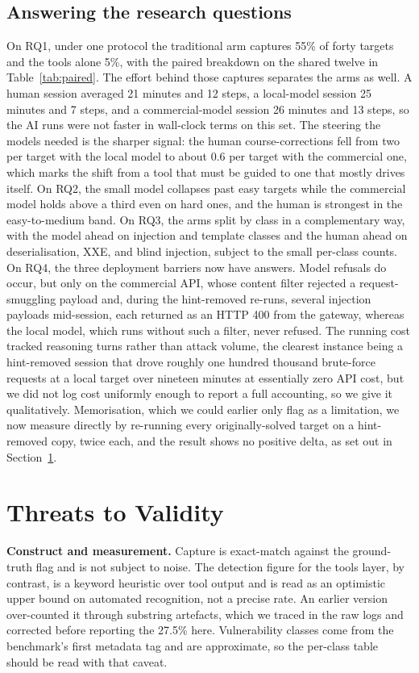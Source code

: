 \documentclass[conference]{IEEEtran}
\begin{document}
\subsection{Answering the research questions}
On RQ1, under one protocol the traditional arm captures 55\% of forty targets and the tools alone 5\%, with the paired breakdown on the shared twelve in Table~\ref{tab:paired}. The effort behind those captures separates the arms as well. A human session averaged 21 minutes and 12 steps, a local-model session 25 minutes and 7 steps, and a commercial-model session 26 minutes and 13 steps, so the AI runs were not faster in wall-clock terms on this set. The steering the models needed is the sharper signal: the human course-corrections fell from two per target with the local model to about 0.6 per target with the commercial one, which marks the shift from a tool that must be guided to one that mostly drives itself. On RQ2, the small model collapses past easy targets while the commercial model holds above a third even on hard ones, and the human is strongest in the easy-to-medium band. On RQ3, the arms split by class in a complementary way, with the model ahead on injection and template classes and the human ahead on deserialisation, XXE, and blind injection, subject to the small per-class counts. On RQ4, the three deployment barriers now have answers. Model refusals do occur, but only on the commercial API, whose content filter rejected a request-smuggling payload and, during the hint-removed re-runs, several injection payloads mid-session, each returned as an HTTP 400 from the gateway, whereas the local model, which runs without such a filter, never refused. The running cost tracked reasoning turns rather than attack volume, the clearest instance being a hint-removed session that drove roughly one hundred thousand brute-force requests at a local target over nineteen minutes at essentially zero API cost, but we did not log cost uniformly enough to report a full accounting, so we give it qualitatively. Memorisation, which we could earlier only flag as a limitation, we now measure directly by re-running every originally-solved target on a hint-removed copy, twice each, and the result shows no positive delta, as set out in Section~\ref{sec:threats}.

\section{Threats to Validity}
\label{sec:threats}

\textbf{Construct and measurement.}
Capture is exact-match against the ground-truth flag and is not subject to noise. The detection figure for the tools layer, by contrast, is a keyword heuristic over tool output and is read as an optimistic upper bound on automated recognition, not a precise rate. An earlier version over-counted it through substring artefacts, which we traced in the raw logs and corrected before reporting the 27.5\% here. Vulnerability classes come from the benchmark's first metadata tag and are approximate, so the per-class table should be read with that caveat.
\end{document}
